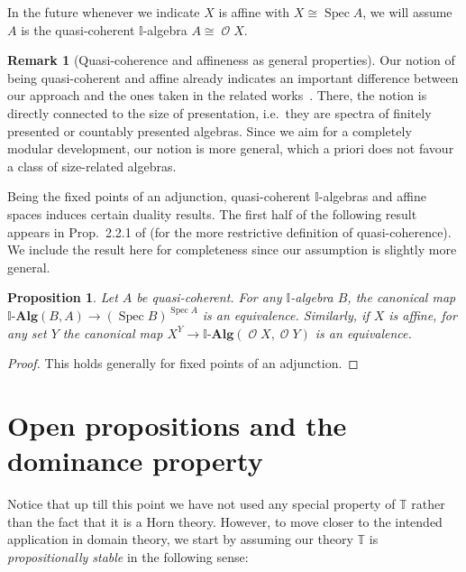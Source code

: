 \documentclass[a4paper,12pt]{amsart}
\newtheorem{proposition}[theorem]{Proposition}
\theoremstyle{definition}
\newtheorem{remark}[theorem]{Remark}
\newcommand{\mc}[1]{\mathcal{#1}}
\newcommand{\mb}[1]{\mathbf{#1}}
\newcommand{\mbb}[1]{\mathbb{#1}}
\newcommand{\T}{\mbb T}
\newcommand{\I}{\mbb I}
\newcommand{\alg}{\text{-}\mb{Alg}}
\newcommand{\spec}{\operatorname{Spec}}
\newcommand{\opens}{\operatorname{\mc{O}}} %
\begin{document}
In the future whenever we indicate $X$ is affine with $X \cong \spec A$, we will assume $A$ is the quasi-coherent $\I$-algebra $A \cong \opens X$.

\begin{remark}[Quasi-coherence and affineness as general properties]
  Our notion of being quasi-coherent and affine already indicates an important difference between our approach and the ones taken in the related works~\cite{Cherubini_Coquand_Hutzler_2024,cherubini2024foundation}. There, the notion is directly connected to the size of presentation, i.e.\ they are spectra of finitely presented or countably presented algebras. Since we aim for a completely modular development, our notion is more general, which a priori does not favour a class of size-related algebras. 
\end{remark}

Being the fixed points of an adjunction, quasi-coherent $\I$-algebras and affine spaces induces certain duality results. The first half of the following result appears in Prop.~2.2.1 of \citet{Cherubini_Coquand_Hutzler_2024} (for the more restrictive definition of quasi-coherence). We include the result here for completeness since our assumption is slightly more general.

\begin{proposition}\label{prop:duality}
  Let $A$ be quasi-coherent. For any $\I$-algebra $B$, the canonical map $\I\alg(B,A) \to (\spec B)^{\spec A}$ is an equivalence. Similarly, if $X$ is affine, for any set $Y$ the canonical map $X^Y \to \I\alg(\opens X,\opens Y)$ is an equivalence.
\end{proposition}
\begin{proof}
  This holds generally for fixed points of an adjunction.
\end{proof}


\section{Open propositions and the dominance property}\label{sec:dominance}

Notice that up till this point we have not used any special property of $\T$ rather than the fact that it is a Horn theory. However, to move closer to the intended application in domain theory, we start by assuming our theory $\T$ is \emph{propositionally stable} in the following sense: 
\end{document}
